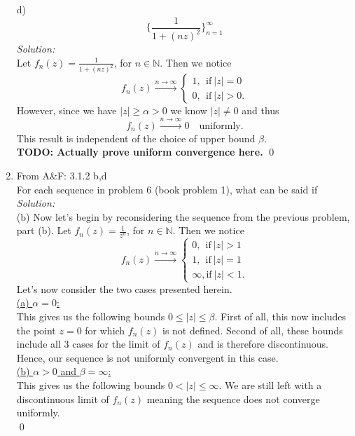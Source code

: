\documentclass[10pt]{amsart}
\theoremstyle{nonumberplain}
\begin{document}
\begin{enumerate}[label={\bf {\arabic*}:}]
\newpage

\noindent
d) $$ \bigg\{ \frac 1 {1 + (nz)^2} \bigg\}_{n=1}^{\infty} $$
\textit{Solution:}\\
Let $f_n(z) = \frac 1 {1 + (nz)^2}$, for $n \in \mathbb N$. Then we notice
$$
f_n(z) \overset{n \to \infty}{\longrightarrow} \begin{cases}
1, \: \: \text{if}\: |z| = 0 \\
0, \: \: \text{if}\: |z| > 0.
\end{cases}
$$
However, since we have $|z| \geq \alpha > 0$ we know $|z| \neq 0$ and thus
$$
f_n(z) \overset{n \to \infty}{\longrightarrow} 0 \quad \text{uniformly}.
$$
This result is independent of the choice of upper bound $\beta$. \\
\textbf{TODO: Actually prove uniform convergence here.}
\qed
\newpage

\item From A\&F: 3.1.2 b,d \\
For each sequence in problem 6 (book problem 1), what can be said if \\
\textit{Solution:} \\
(b) Now let's begin by reconsidering the sequence from the previous problem, part (b).
Let $f_n(z) = \frac 1 {z^n}$, for $n \in \mathbb N$. Then we notice
$$
f_n(z) \overset{n \to \infty}{\longrightarrow} \begin{cases}
0, \: \: \text{if}\: |z| > 1 \\
1, \: \: \text{if}\: |z| = 1 \\
\infty, \text{if}\: |z| < 1.
\end{cases}
$$
Let's now consider the two cases presented herein. \\

\underline{(a) $\alpha = 0$:} \\
This gives us the following bounds $0 \leq |z| \leq \beta$.
First of all, this now includes the point $z = 0$ for which $f_n(z)$ is not defined.
Second of all, these bounds include all 3 cases for the limit of $f_n(z)$ and is therefore discontinuous.
Hence, our sequence is not uniformly convergent in this case. \\

\underline{(b) $\alpha > 0$ and $\beta = \infty$:} \\
This gives us the following bounds $0 < |z| \leq \infty$.
We are still left with a discontinuous limit of $f_n(z)$ meaning the sequence does not converge uniformly. \\
\qed \\


\end{enumerate}
\end{document}
